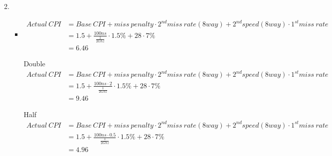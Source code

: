 \documentclass{article}
\begin{document}
\begin{enumerate}[1)]
\begin{enumerate}
\begin{itemize}
\begin{equation}
                        \end{equation}
                \end{itemize}
            \item 
                \begin{itemize}
                    \item 
                        \begin{equation}
                            \begin{split}
                                Actual\:CPI &= Base\:CPI + miss\:penalty \cdot 2^{nd} miss\:rate(8 way) + 2^{nd} speed(8 way) \cdot 1^{st}miss\:rate \\
                                &= 1.5 + \frac{100ns}{\frac{1}{2Ghz}} \cdot 1.5\% + 28 \cdot 7\% \\
                                &= 6.46
                            \end{split}
                        \end{equation}
                    \item [Double]
                        \begin{equation}
                            \begin{split}
                                Actual\:CPI &= Base\:CPI + miss\:penalty \cdot 2^{nd} miss\:rate(8 way) + 2^{nd} speed(8 way) \cdot 1^{st}miss\:rate \\
                                &= 1.5 + \frac{100ns \cdot 2}{\frac{1}{2Ghz}} \cdot 1.5\% + 28 \cdot 7\% \\
                                &= 9.46
                            \end{split}
                        \end{equation}
                    \item [Half]
                        \begin{equation}
                            \begin{split}
                                Actual\:CPI &= Base\:CPI + miss\:penalty \cdot 2^{nd} miss\:rate(8 way) + 2^{nd} speed(8 way) \cdot 1^{st}miss\:rate \\
                                &= 1.5 + \frac{100ns \cdot 0.5}{\frac{1}{2Ghz}} \cdot 1.5\% + 28 \cdot 7\% \\
                                &= 4.96
                            \end{split}
                        \end{equation}
                \end{itemize}

\end{enumerate}
\end{enumerate}
\end{document}
